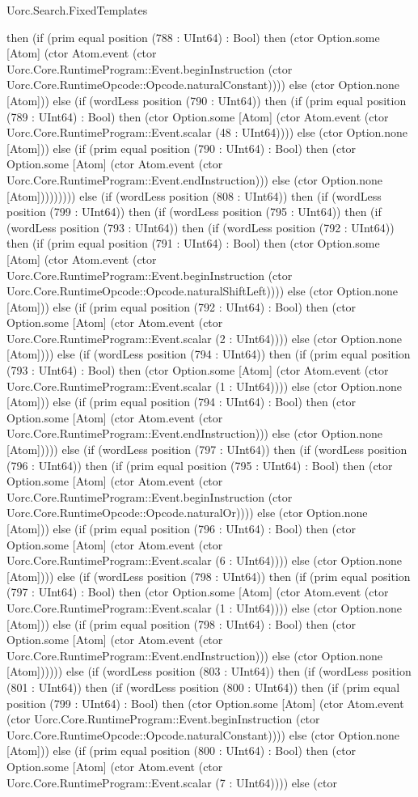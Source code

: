 \begin{lexlean}{Uorc.Search.FixedTemplates}
\begin{semanticmodule}
{then (if (prim equal position (788 : UInt64) : Bool) then (ctor Option.some [Atom] (ctor Atom.event (ctor Uorc.Core.RuntimeProgram::Event.beginInstruction (ctor Uorc.Core.RuntimeOpcode::Opcode.naturalConstant)))) else (ctor Option.none [Atom])) else (if (wordLess position (790 : UInt64)) then (if (prim equal position (789 : UInt64) : Bool) then (ctor Option.some [Atom] (ctor Atom.event (ctor Uorc.Core.RuntimeProgram::Event.scalar (48 : UInt64)))) else (ctor Option.none [Atom])) else (if (prim equal position (790 : UInt64) : Bool) then (ctor Option.some [Atom] (ctor Atom.event (ctor Uorc.Core.RuntimeProgram::Event.endInstruction))) else (ctor Option.none [Atom])))))))) else (if (wordLess position (808 : UInt64)) then (if (wordLess position (799 : UInt64)) then (if (wordLess position (795 : UInt64)) then (if (wordLess position (793 : UInt64)) then (if (wordLess position (792 : UInt64)) then (if (prim equal position (791 : UInt64) : Bool) then (ctor Option.some [Atom] (ctor Atom.event (ctor Uorc.Core.RuntimeProgram::Event.beginInstruction (ctor Uorc.Core.RuntimeOpcode::Opcode.naturalShiftLeft)))) else (ctor Option.none [Atom])) else (if (prim equal position (792 : UInt64) : Bool) then (ctor Option.some [Atom] (ctor Atom.event (ctor Uorc.Core.RuntimeProgram::Event.scalar (2 : UInt64)))) else (ctor Option.none [Atom]))) else (if (wordLess position (794 : UInt64)) then (if (prim equal position (793 : UInt64) : Bool) then (ctor Option.some [Atom] (ctor Atom.event (ctor Uorc.Core.RuntimeProgram::Event.scalar (1 : UInt64)))) else (ctor Option.none [Atom])) else (if (prim equal position (794 : UInt64) : Bool) then (ctor Option.some [Atom] (ctor Atom.event (ctor Uorc.Core.RuntimeProgram::Event.endInstruction))) else (ctor Option.none [Atom])))) else (if (wordLess position (797 : UInt64)) then (if (wordLess position (796 : UInt64)) then (if (prim equal position (795 : UInt64) : Bool) then (ctor Option.some [Atom] (ctor Atom.event (ctor Uorc.Core.RuntimeProgram::Event.beginInstruction (ctor Uorc.Core.RuntimeOpcode::Opcode.naturalOr)))) else (ctor Option.none [Atom])) else (if (prim equal position (796 : UInt64) : Bool) then (ctor Option.some [Atom] (ctor Atom.event (ctor Uorc.Core.RuntimeProgram::Event.scalar (6 : UInt64)))) else (ctor Option.none [Atom]))) else (if (wordLess position (798 : UInt64)) then (if (prim equal position (797 : UInt64) : Bool) then (ctor Option.some [Atom] (ctor Atom.event (ctor Uorc.Core.RuntimeProgram::Event.scalar (1 : UInt64)))) else (ctor Option.none [Atom])) else (if (prim equal position (798 : UInt64) : Bool) then (ctor Option.some [Atom] (ctor Atom.event (ctor Uorc.Core.RuntimeProgram::Event.endInstruction))) else (ctor Option.none [Atom]))))) else (if (wordLess position (803 : UInt64)) then (if (wordLess position (801 : UInt64)) then (if (wordLess position (800 : UInt64)) then (if (prim equal position (799 : UInt64) : Bool) then (ctor Option.some [Atom] (ctor Atom.event (ctor Uorc.Core.RuntimeProgram::Event.beginInstruction (ctor Uorc.Core.RuntimeOpcode::Opcode.naturalConstant)))) else (ctor Option.none [Atom])) else (if (prim equal position (800 : UInt64) : Bool) then (ctor Option.some [Atom] (ctor Atom.event (ctor Uorc.Core.RuntimeProgram::Event.scalar (7 : UInt64)))) else (ctor }
\end{semanticmodule}
\end{lexlean}
